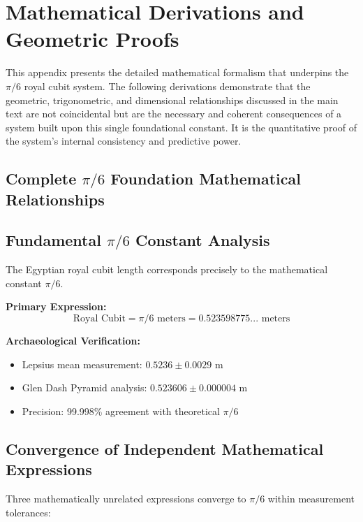 \documentclass[11pt]{article}
\begin{document}





\appendix
\section{Mathematical Derivations and Geometric Proofs}

This appendix presents the detailed mathematical formalism that underpins the $\pi/6$ royal cubit system. The following derivations demonstrate that the geometric, trigonometric, and dimensional relationships discussed in the main text are not coincidental but are the necessary and coherent consequences of a system built upon this single foundational constant. It is the quantitative proof of the system's internal consistency and predictive power.

\subsection{Complete \texorpdfstring{$\pi/6$}{pi/6} Foundation Mathematical Relationships}

\subsection{Fundamental \texorpdfstring{$\pi/6$}{pi/6} Constant Analysis}
The Egyptian royal cubit length corresponds precisely to the mathematical constant $\pi/6$.

\textbf{Primary Expression:}
\[ \text{Royal Cubit} = \pi/6 \text{ meters} = 0.523598775... \text{ meters} \]

\textbf{Archaeological Verification:}
\begin{itemize}
    \item Lepsius mean measurement: $0.5236 \pm 0.0029$ m
    \item Glen Dash Pyramid analysis: $0.523606 \pm 0.000004$ m
    \item Precision: 99.998\% agreement with theoretical $\pi/6$
\end{itemize}

\subsection{Convergence of Independent Mathematical Expressions}
Three mathematically unrelated expressions converge to $\pi/6$ within measurement tolerances:
\end{document}
